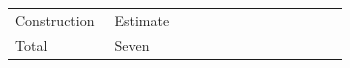 \begin{tabular}{p{0.28\linewidth}p{0.66\linewidth}}Construction & Estimate \\ Total & Seven \\ \end{tabular}
